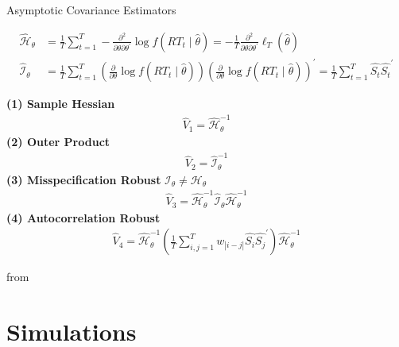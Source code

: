 \documentclass[8pt]{beamer}
\begin{document}
\begin{frame}{Asymptotic Covariance Estimators}

\begin{align}
    \widehat{\mathcal{H}}_\theta &= \frac{1}{T}\sum_{t=1}^T-\frac{\partial^2}{\partial\theta\partial\theta^{\prime}}\log f(RT_t\mid\hat{\theta})=-\frac{1}{T}\frac{\partial^2}{\partial\theta\partial\theta^{\prime}}\ell_T(\hat{\theta})\\
    \widehat{\mathscr{I}}_\theta &= \frac{1}{T}\sum_{t=1}^T\left(\frac{\partial}{\partial\theta}\log f(RT_t\mid\hat{\theta})\right)\left(\frac{\partial}{\partial\theta}\log f(RT_t\mid\hat{\theta})\right)^{\prime} = \frac{1}{T} \sum_{t=1}^T \hat{S_t} \hat{S_t}^\prime
\end{align}

\textbf{(1) Sample Hessian}\\
\begin{align}
    \widehat V_1 = \widehat{\mathcal{H}}_\theta^{-1}
\end{align}
\textbf{(2) Outer Product}\\
\begin{align}
    \widehat V_2 = \widehat{\mathscr{I}}_\theta^{-1}
\end{align}
\textbf{(3) Misspecification Robust} $\mathscr{I}_\theta \ne \mathcal{H}_\theta$\\
\begin{align}
    \widehat V_3 = \widehat{\mathcal{H}}_\theta^{-1} \widehat{\mathscr{I}}_\theta \widehat{\mathcal{H}}_\theta^{-1}
\end{align}
\textbf{(4) Autocorrelation Robust}\\
\begin{align}
    \widehat V_4 = \widehat{\mathcal{H}}_\theta^{-1} \left(\frac{1}{T} \sum_{i,j=1}^T w_{|i-j|} \hat{S_i} \hat{S_j}^\prime\right) \widehat{\mathcal{H}}_\theta^{-1}
\end{align}

from \citet[Chapter~10]{hansen_probability_2022}

\end{frame}



\section{Simulations}
\end{document}
